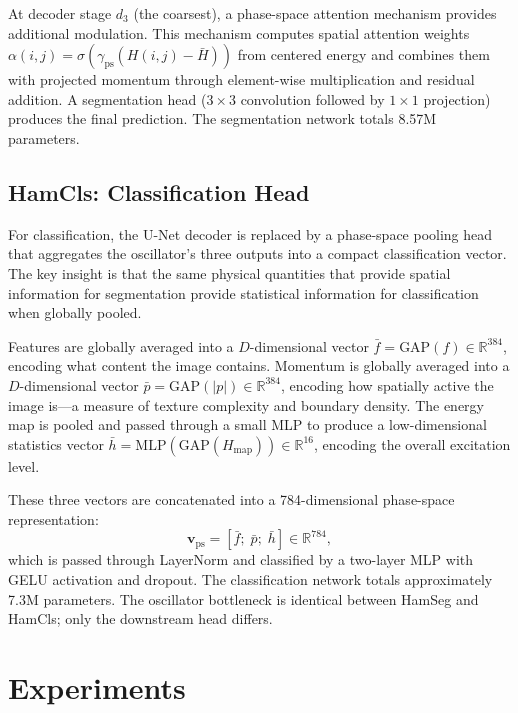 \documentclass[11pt]{article}
\begin{document}
At decoder stage $d_3$ (the coarsest), a phase-space attention mechanism provides additional modulation. This mechanism computes spatial attention weights $\alpha(i,j) = \sigma(\gamma_\text{ps}(H(i,j) - \bar{H}))$ from centered energy and combines them with projected momentum through element-wise multiplication and residual addition. A segmentation head ($3 \times 3$ convolution followed by $1 \times 1$ projection) produces the final prediction. The segmentation network totals 8.57M parameters.


\subsection{HamCls: Classification Head}

For classification, the U-Net decoder is replaced by a phase-space pooling head that aggregates the oscillator's three outputs into a compact classification vector. The key insight is that the same physical quantities that provide spatial information for segmentation provide statistical information for classification when globally pooled.

Features are globally averaged into a $D$-dimensional vector $\bar{f} = \text{GAP}(f) \in \mathbb{R}^{384}$, encoding what content the image contains. Momentum is globally averaged into a $D$-dimensional vector $\bar{p} = \text{GAP}(|p|) \in \mathbb{R}^{384}$, encoding how spatially active the image is---a measure of texture complexity and boundary density. The energy map is pooled and passed through a small MLP to produce a low-dimensional statistics vector $\bar{h} = \text{MLP}(\text{GAP}(H_\text{map})) \in \mathbb{R}^{16}$, encoding the overall excitation level.

These three vectors are concatenated into a 784-dimensional phase-space representation:
\begin{equation}
    \mathbf{v}_\text{ps} = [\bar{f};\; \bar{p};\; \bar{h}] \in \mathbb{R}^{784},
    \label{eq:ps_vector}
\end{equation}
which is passed through LayerNorm and classified by a two-layer MLP with GELU activation and dropout. The classification network totals approximately 7.3M parameters. The oscillator bottleneck is identical between HamSeg and HamCls; only the downstream head differs.


\section{Experiments}
\label{sec:experiments}
\end{document}
